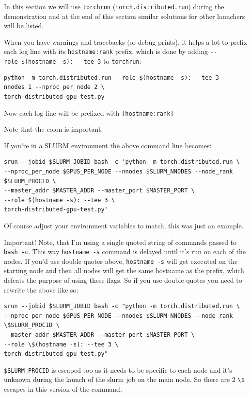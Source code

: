 \documentclass[
]{report}
\begin{document}
In this section we will use \texttt{torchrun}
(\texttt{torch.distributed.run}) during the demonstration and at the end
of this section similar solutions for other launchers will be listed.

When you have warnings and tracebacks (or debug prints), it helps a lot
to prefix each log line with its \texttt{hostname:rank} prefix, which is
done by adding \texttt{-\/-role\ \$(hostname\ -s):\ -\/-tee\ 3} to
\texttt{torchrun}:

\begin{verbatim}
python -m torch.distributed.run --role $(hostname -s): --tee 3 --nnodes 1 --nproc_per_node 2 \
torch-distributed-gpu-test.py
\end{verbatim}

Now each log line will be prefixed with \texttt{{[}hostname:rank{]}}

Note that the colon is important.

If you're in a SLURM environment the above command line becomes:

\begin{verbatim}
srun --jobid $SLURM_JOBID bash -c 'python -m torch.distributed.run \
--nproc_per_node $GPUS_PER_NODE --nnodes $SLURM_NNODES --node_rank $SLURM_PROCID \
--master_addr $MASTER_ADDR --master_port $MASTER_PORT \
--role $(hostname -s): --tee 3 \
torch-distributed-gpu-test.py'
\end{verbatim}

Of course adjust your environment variables to match, this was just an
example.

Important! Note, that I'm using a single quoted string of commands
passed to \texttt{bash\ -c}. This way \texttt{hostname\ -s} command is
delayed until it's run on each of the nodes. If you'd use double quotes
above, \texttt{hostname\ -s} will get executed on the starting node and
then all nodes will get the same hostname as the prefix, which defeats
the purpose of using these flags. So if you use double quotes you need
to rewrite the above like so:

\begin{verbatim}
srun --jobid $SLURM_JOBID bash -c "python -m torch.distributed.run \
--nproc_per_node $GPUS_PER_NODE --nnodes $SLURM_NNODES --node_rank \$SLURM_PROCID \
--master_addr $MASTER_ADDR --master_port $MASTER_PORT \
--role \$(hostname -s): --tee 3 \
torch-distributed-gpu-test.py"
\end{verbatim}

\texttt{\$SLURM\_PROCID} is escaped too as it needs to be specific to
each node and it's unknown during the launch of the slurm job on the
main node. So there are 2 \texttt{\textbackslash{}\$} escapes in this
version of the command.
\end{document}
